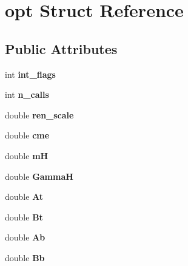 \hypertarget{structopt}{\section{opt Struct Reference}
\label{structopt}
}
\subsection*{Public Attributes}
\begin{DoxyCompactItemize}
\item 
\hypertarget{structopt_acc52d812132128f6088537b4e7e07be6}{int {\bfseries int\-\_\-flags}}\label{structopt_acc52d812132128f6088537b4e7e07be6}

\item 
\hypertarget{structopt_a6ddc969cea0f437ecea3bb299d14f69d}{int {\bfseries n\-\_\-calls}}\label{structopt_a6ddc969cea0f437ecea3bb299d14f69d}

\item 
\hypertarget{structopt_a076fcc87cf2c8ce62c9504c304015d45}{double {\bfseries ren\-\_\-scale}}\label{structopt_a076fcc87cf2c8ce62c9504c304015d45}

\item 
\hypertarget{structopt_a8f98480b8d9fd189e551b50bf7b0e87d}{double {\bfseries cme}}\label{structopt_a8f98480b8d9fd189e551b50bf7b0e87d}

\item 
\hypertarget{structopt_ad1b957514a9167bd98702fe28164d8b0}{double {\bfseries m\-H}}\label{structopt_ad1b957514a9167bd98702fe28164d8b0}

\item 
\hypertarget{structopt_a16156d318278444ca198e3ce8ce0d2f5}{double {\bfseries Gamma\-H}}\label{structopt_a16156d318278444ca198e3ce8ce0d2f5}

\item 
\hypertarget{structopt_a6eff22383bb8bd0d4102be7f449e9d3e}{double {\bfseries At}}\label{structopt_a6eff22383bb8bd0d4102be7f449e9d3e}

\item 
\hypertarget{structopt_a92ea7532f4697352c6651bab251afcf6}{double {\bfseries Bt}}\label{structopt_a92ea7532f4697352c6651bab251afcf6}

\item 
\hypertarget{structopt_a40966817c4ab35a1c2971874b4d013f1}{double {\bfseries Ab}}\label{structopt_a40966817c4ab35a1c2971874b4d013f1}

\item 
\hypertarget{structopt_ae47eb63b3b7691d38d07e9e79ef7de0f}{double {\bfseries Bb}}\label{structopt_ae47eb63b3b7691d38d07e9e79ef7de0f}


\end{DoxyCompactItemize}
